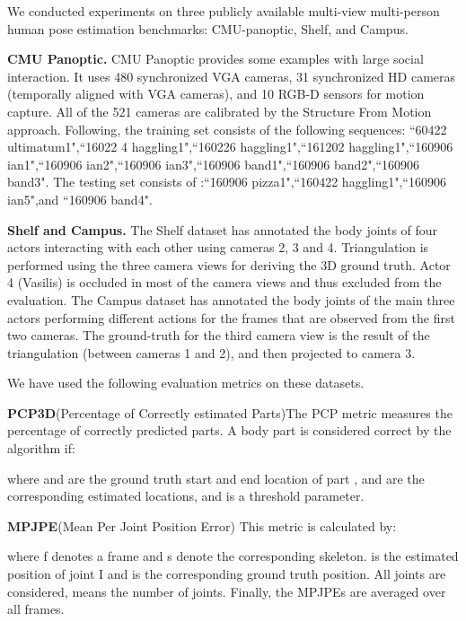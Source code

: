 \documentclass[lettersize,journal]{IEEEtran}
\begin{document}
\par We conducted experiments on three publicly available multi-view multi-person human pose estimation benchmarks: CMU-panoptic, Shelf, and Campus.
\par \textbf{CMU Panoptic.} CMU Panoptic provides some examples with large social interaction. It uses 480 synchronized VGA cameras, 31 synchronized HD cameras (temporally aligned with VGA cameras), and 10 RGB-D sensors for motion capture. All of the 521 cameras are calibrated by the Structure From Motion approach. Following\cite{tu2020voxelpose}, the training set consists of the following sequences: ``60422 ultimatum1",``16022 4 haggling1",``160226 haggling1",``161202 haggling1",``160906 ian1",``160906
ian2",``160906 ian3",``160906 band1",``160906 band2",``160906 band3". The testing set consists of :``160906 pizza1",``160422 haggling1",``160906 ian5",and ``160906 band4".

\par \textbf{Shelf and Campus.} The Shelf dataset has annotated the body joints of four actors interacting with each other using cameras 2, 3 and 4. Triangulation is performed using the three camera views for deriving the 3D ground truth. Actor 4 (Vasilis) is occluded in most of the camera views and thus excluded from the evaluation. The Campus dataset has annotated the body joints of the main three actors performing different actions for the frames that are observed from the first two cameras. The ground-truth for the third camera view is the result of the triangulation (between cameras 1 and 2), and then projected to camera 3.

\par We have used the following evaluation metrics on these datasets.
\par \textbf{PCP3D}(Percentage of Correctly estimated Parts)The PCP metric measures the percentage of correctly predicted parts. A body part is considered correct by the algorithm if:


where  and  are the ground truth start and end location of part ,  and  are the corresponding estimated locations, and   is a threshold parameter.

\par \textbf{MPJPE}(Mean Per Joint Position Error) This metric is calculated by:


where f denotes a frame and s denote the corresponding skeleton.  is the estimated position of joint I and  is the corresponding ground truth position. All joints are considered,  means the number of joints. Finally, the MPJPEs are averaged over all frames.
\end{document}
